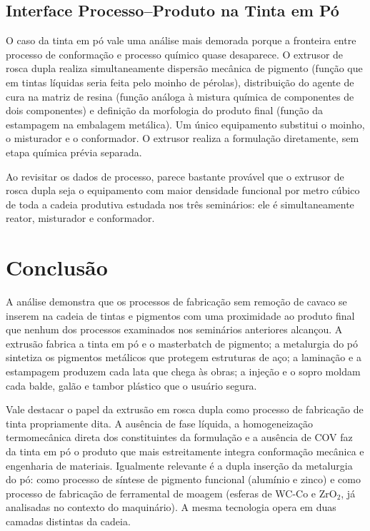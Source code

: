 \documentclass[
  12pt,
  a4paper,
  oneside,
  brazil,
  chapter=TITLE
]{article}
\newcommand{\secbreak}{\clearpage}
\let\oldsection\section
\renewcommand{\section}{\secbreak\oldsection}
\begin{document}
\subsection{Interface Processo--Produto na Tinta em Pó}\label{interface}

O caso da tinta em pó vale uma análise mais demorada porque a fronteira entre
processo de conformação e processo químico quase desaparece. O extrusor de rosca
dupla realiza simultaneamente dispersão mecânica de pigmento (função que em tintas
líquidas seria feita pelo moinho de pérolas), distribuição do agente de cura na
matriz de resina (função análoga à mistura química de componentes de dois
componentes) e definição da morfologia do produto final (função da estampagem na
embalagem metálica). Um único equipamento substitui o moinho, o misturador e o
conformador. O extrusor realiza a formulação diretamente, sem etapa química prévia
separada.

Ao revisitar os dados de processo, parece bastante provável que o extrusor de
rosca dupla seja o equipamento com maior densidade funcional por metro cúbico de
toda a cadeia produtiva estudada nos três seminários: ele é simultaneamente
reator, misturador e conformador.

\section{Conclusão}\label{conclusao}

A análise demonstra que os processos de fabricação sem remoção de cavaco se
inserem na cadeia de tintas e pigmentos com uma proximidade ao produto final que
nenhum dos processos examinados nos seminários anteriores alcançou. A extrusão
fabrica a tinta em pó e o masterbatch de pigmento; a metalurgia do pó sintetiza
os pigmentos metálicos que protegem estruturas de aço; a laminação e a estampagem
produzem cada lata que chega às obras; a injeção e o sopro moldam cada balde,
galão e tambor plástico que o usuário segura.

Vale destacar o papel da extrusão em rosca dupla como processo de fabricação de
tinta propriamente dita. A ausência de fase líquida, a homogeneização
termomecânica direta dos constituintes da formulação e a ausência de COV faz da
tinta em pó o produto que mais estreitamente integra conformação mecânica e
engenharia de materiais. Igualmente relevante é a dupla inserção da metalurgia do
pó: como processo de síntese de pigmento funcional (alumínio e zinco) e como
processo de fabricação de ferramental de moagem (esferas de WC-Co e ZrO$_2$, já
analisadas no contexto do maquinário). A mesma tecnologia opera em duas camadas
distintas da cadeia.
\end{document}
